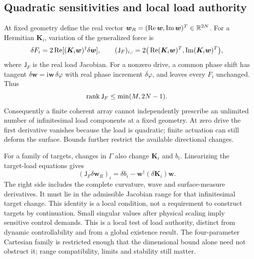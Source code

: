 \subsection{Quadratic sensitivities and local load authority}
At fixed geometry define the real vector
$\bm w_R=(\operatorname{Re}\bm w,\operatorname{Im}\bm w)^T\in\mathbb R^{2N}$. For a Hermitian $\bm K_i$,
variation of the generalized force is
\begin{equation}
 \delta F_i=2\operatorname{Re}[(\bm K_i\bm w)^\dagger\delta\bm w],\qquad
 (\mathsf J_F)_{i,:}
    =2\big(\operatorname{Re}(\bm K_i\bm w)^T,\operatorname{Im}(\bm K_i\bm w)^T\big),
 \label{eq:quadratic-jacobian}
\end{equation}
where $\mathsf J_F$ is the real load Jacobian. For a nonzero drive, a common
phase shift has tangent $\delta\bm w=\mathrm i\bm w\,\delta\varphi$ with
real phase increment $\delta\varphi$, and leaves every $F_i$ unchanged. Thus
\begin{equation}
 \operatorname{rank}\mathsf J_F\leq\min(M,2N-1).
 \label{eq:local-rank-bound}
\end{equation}
Consequently a finite coherent array cannot independently prescribe an
unlimited number of infinitesimal load components at a fixed geometry. At zero
drive the first derivative vanishes because the load is quadratic; finite
actuation can still deform the surface. Bounds further restrict the available
directional changes.

For a family of targets, changes in $\Gamma$ also change $\bm K_i$ and $b_i$.
Linearizing the target-load equations gives
\begin{equation}
 (\mathsf J_F\delta\bm w_R)_i
       =\delta b_i-\bm w^\dagger(\delta\bm K_i)\bm w.
 \label{eq:target-to-drive-tangent}
\end{equation}
The right side includes the complete curvature, wave and surface-measure
derivatives. It must lie in the admissible Jacobian range for that infinitesimal target change. This identity is a local condition,
not a requirement to construct targets by continuation. Small singular values after physical scaling imply sensitive
control demands. This is a local test of load authority, distinct from
dynamic controllability and from a global existence result. The four-parameter
Cartesian family is restricted enough that the dimensional bound alone need
not obstruct it; range compatibility, limits and stability still matter.

